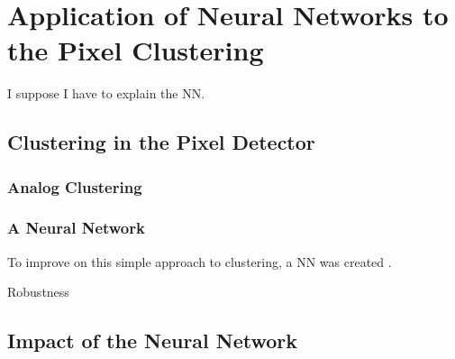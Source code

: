 
\chapter{Application of Neural Networks to the Pixel Clustering} %

\label{ch:nn} %


I suppose I have to explain the NN.


\section{Clustering in the Pixel Detector}

\subsection{Analog Clustering}

\subsection{A Neural Network}

To improve on this simple approach to clustering, a \ac{NN} was created \cite{PERF-2012-05} \cite{ATL-PHYS-PUB-2015-044}. 

Robustness \cite{ATL-PHYS-PUB-2015-052}

\section{Impact of the Neural Network}